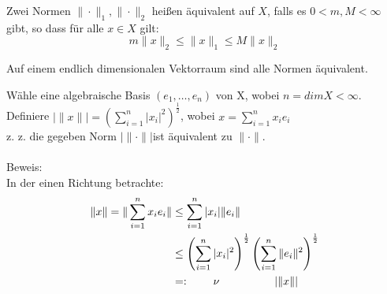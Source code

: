 \begin{definition} 
	Zwei Normen $\| \cdot \|_{1}, \| \cdot \|_{2}$ hei{\ss}en äquivalent auf $X$, falls es $0 < m, M < \infty$ gibt, so dass für alle $ x \in X$ gilt:
	\[ m \| x \|_{2} \leq \| x \|_{1} \leq M \| x \|_{2} \]
\end{definition}
 
\begin{satz} 
	Auf einem endlich dimensionalen Vektorraum sind alle Normen äquivalent.
\end{satz}
\begin{beweis}
	Wähle eine algebraische Basis $(e_{1}, \dotsc, e_{n})$ von X, wobei $ n = dim X < \infty$. \\
	Definiere $|\|x\|| = \left(\sum_{i = 1}^{n} |x_{i}|^2\right)^{\frac{1}{2}}$, wobei $x = \sum_{i = 1}^{n} x_{i} e_{i}$ \\
	
	z. z. die gegeben Norm $|\| \cdot \||$ist äquivalent zu $\| \cdot \|$. \\ \\
	Beweis: \\
	In der einen Richtung betrachte: 
	\begin{align*}
		\| x \| = \| \sum_{i = 1}^{n} x_{i} e_{i} \| & \leq \sum_{i = 1}^{n} |x_{i}| \|  e_{i} \| \\ 
													& \leq \left( \sum_{i = 1}^{n} |x_{i}|^{2} \right)^\frac{1}{2}  \left( \sum_{i = 1}^{n} \| e_{i} \|^{2} \right)^\frac{1}{2} \\
													& =: \hspace{0.75cm} \nu \hspace{1.75cm} |\| x \||		
	\end{align*}
	

\end{beweis}
